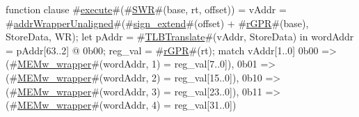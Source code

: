 function clause #\hyperref[zexecute]{execute}#(#\hyperref[zSWR]{SWR}#(base, rt, offset)) =
      {
        vAddr = #\hyperref[zaddrWrapperUnaligned]{addrWrapperUnaligned}#(#\hyperref[zsignzyextend]{sign\_extend}#(offset) + #\hyperref[zrGPR]{rGPR}#(base), StoreData, WR);
        let pAddr = #\hyperref[zTLBTranslate]{TLBTranslate}#(vAddr, StoreData) in
          {
            wordAddr = pAddr[63..2] @ 0b00;
            reg_val = #\hyperref[zrGPR]{rGPR}#(rt);
            match vAddr[1..0]
              {
                0b00  => (#\hyperref[zMEMwzywrapper]{MEMw\_wrapper}#(wordAddr, 1) = reg_val[7..0]),
                0b01  => (#\hyperref[zMEMwzywrapper]{MEMw\_wrapper}#(wordAddr, 2) = reg_val[15..0]),
                0b10  => (#\hyperref[zMEMwzywrapper]{MEMw\_wrapper}#(wordAddr, 3) = reg_val[23..0]),
                0b11  => (#\hyperref[zMEMwzywrapper]{MEMw\_wrapper}#(wordAddr, 4) = reg_val[31..0])
              }
          }
      }
